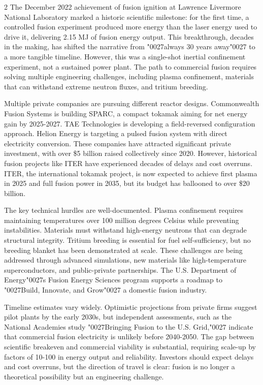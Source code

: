 \documentclass[10pt,a4paper]{article}
\newcommand{\BOApos}{{\BOQuoteFont\char"0027}}
\begin{document}
\begin{multicols}{2}
{\small The December 2022 achievement of fusion ignition at Lawrence Livermore National Laboratory marked a historic scientific milestone: for the first time, a controlled fusion experiment produced more energy than the laser energy used to drive it, delivering 2.15 MJ of fusion energy output. This breakthrough, decades in the making, has shifted the narrative from \BOApos{}always 30 years away\BOApos{} to a more tangible timeline. However, this was a single-shot inertial confinement experiment, not a sustained power plant. The path to commercial fusion requires solving multiple engineering challenges, including plasma confinement, materials that can withstand extreme neutron fluxes, and tritium breeding.}\par
{\small Multiple private companies are pursuing different reactor designs. Commonwealth Fusion Systems is building SPARC, a compact tokamak aiming for net energy gain by 2025-2027. TAE Technologies is developing a field-reversed configuration approach. Helion Energy is targeting a pulsed fusion system with direct electricity conversion. These companies have attracted significant private investment, with over \$5 billion raised collectively since 2020. However, historical fusion projects like ITER have experienced decades of delays and cost overruns. ITER, the international tokamak project, is now expected to achieve first plasma in 2025 and full fusion power in 2035, but its budget has ballooned to over \$20 billion.}\par
{\small The key technical hurdles are well-documented. Plasma confinement requires maintaining temperatures over 100 million degrees Celsius while preventing instabilities. Materials must withstand high-energy neutrons that can degrade structural integrity. Tritium breeding is essential for fuel self-sufficiency, but no breeding blanket has been demonstrated at scale. These challenges are being addressed through advanced simulations, new materials like high-temperature superconductors, and public-private partnerships. The U.S. Department of Energy\BOApos{}s Fusion Energy Sciences program supports a roadmap to \BOApos{}Build, Innovate, and Grow\BOApos{} a domestic fusion industry.}\par
{\small Timeline estimates vary widely. Optimistic projections from private firms suggest pilot plants by the early 2030s, but independent assessments, such as the National Academies study \BOApos{}Bringing Fusion to the U.S. Grid,\BOApos{} indicate that commercial fusion electricity is unlikely before 2040-2050. The gap between scientific breakeven and commercial viability is substantial, requiring scale-up by factors of 10-100 in energy output and reliability. Investors should expect delays and cost overruns, but the direction of travel is clear: fusion is no longer a theoretical possibility but an engineering challenge.}\par

\end{multicols}
\end{document}
